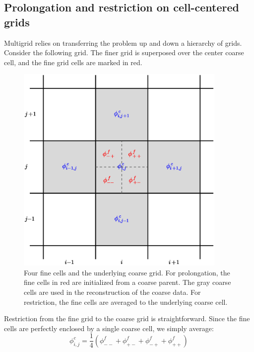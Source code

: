 \subsection{Prolongation and restriction on cell-centered grids}

Multigrid relies on transferring the problem up and down a hierarchy of
grids.  Consider the following grid.  The finer grid is superposed over
the center coarse cell, and the fine grid cells are marked in red.

\begin{figure}[h]
\centering
\includegraphics[width=4.0in]{2dgrid-prolong}
\caption[The geometry for 2-d
  prolongation.]{\label{fig:2dgrid-prolong} Four fine cells and the
  underlying coarse grid.  For prolongation, the fine cells in red are
  initialized from a coarse parent.  The gray coarse cells are used in
  the reconstruction of the coarse data.  For restriction, the fine
  cells are averaged to the underlying coarse cell.}
\end{figure}

Restriction from the fine grid to the coarse grid is straightforward.
Since the fine cells are perfectly enclosed by a single coarse cell,
we simply average:
\begin{equation}
\phi_{i,j}^c = \frac{1}{4} ( \phi_{--}^f + \phi_{+-}^f +
                             \phi_{-+}^f + \phi_{++}^f )
\end{equation}

